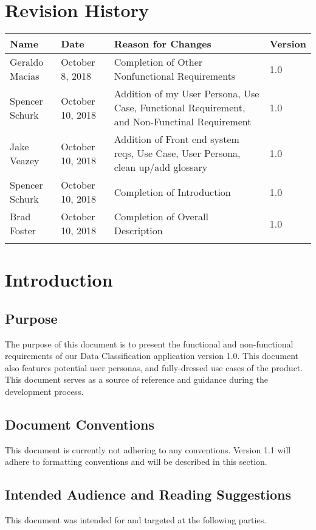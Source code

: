 \documentclass[12pt,oneside,letterpaper]{article}
\begin{document}
\section*{Revision History}
\begin{tabular}{|l|l|p{2.5in}|l|}
\hline
\textbf{Name}&\textbf{Date}&\textbf{Reason for Changes}&\textbf{Version}\\
\hline
Geraldo Macias&October 8, 2018&Completion of Other Nonfunctional Requirements&1.0\\
\hline
Spencer Schurk&October 10, 2018&Addition of my User Persona, Use Case, Functional Requirement, and Non-Functinal Requirement&1.0\\
\hline
Jake Veazey&October 10, 2018&Addition of Front end system reqs, Use Case, User Persona, clean up/add glossary&1.0\\
\hline
Spencer Schurk&October 10, 2018&Completion of Introduction&1.0\\
\hline
Brad Foster&October 10, 2018&Completion of Overall Description&1.0\\
\hline
&&&\\
\hline
\end{tabular}

\newpage

\section{Introduction}
\subsection{Purpose}
The purpose of this document is to present the functional and non-functional requirements of our Data Classification application version 1.0. This document also features potential user personas, and fully-dressed use cases of the product. This document serves as a source of reference and guidance during the development process.

\subsection{Document Conventions}
This document is currently not adhering to any conventions. Version 1.1 will adhere to formatting conventions and will be described in this section.

\subsection{Intended Audience and Reading Suggestions}
This document was intended for and targeted at the following parties.
\end{document}
